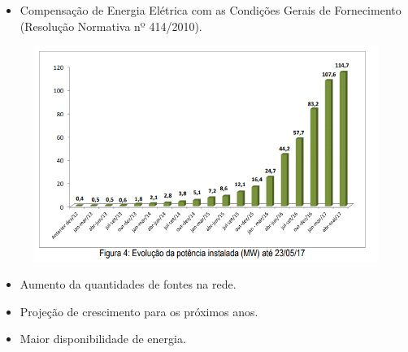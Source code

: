 \begin{frame}
  \begin{block}{}
   \begin{itemize}
      \item Compensação de Energia Elétrica com as Condições Gerais de
        Fornecimento (Resolução Normativa nº 414/2010).
   \end{itemize}
  \end{block}
  \begin{figure}[h]
  	\begin{center}
      \includegraphics [scale=0.3]{./Figures/t04}
  	\end{center}
  \end{figure}
\end{frame}

\begin{frame}
  \begin{block}{}
   \begin{itemize}
        \item Aumento da quantidades de fontes na rede.
        \item Projeção de crescimento para os próximos anos.
        \item Maior disponibilidade de energia.
   \end{itemize}
  \end{block}
	\begin{figure}[!htb]
		\centering
		\quad %
	\end{figure}
\end{frame}

